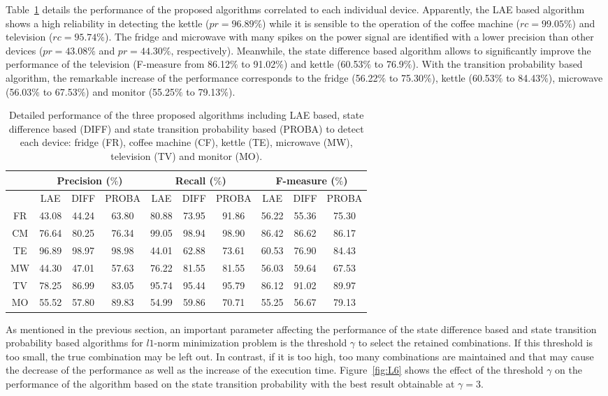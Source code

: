 Table~\ref{table:t2} details the performance of the proposed algorithms correlated to each individual device. Apparently, the LAE based algorithm shows a high reliability in detecting the kettle ($pr=96.89\%$) while it is sensible to the operation of the coffee machine ($rc=99.05\%$) and television ($rc=95.74\%$). The fridge and microwave with many spikes on the power signal are identified with a lower precision than other devices ($pr=43.08\%$ and $pr=44.30\%$, respectively). Meanwhile, the state difference based algorithm allows to significantly improve the performance of the television (F-measure from 86.12$\%$ to 91.02$\%$) and kettle (60.53$\%$ to 76.9$\%$). With the transition probability based algorithm, the remarkable increase of the performance corresponds to the fridge (56.22$\%$ to 75.30$\%$), kettle (60.53$\%$ to 84.43$\%$), microwave (56.03$\%$ to 67.53$\%$) and monitor (55.25$\%$ to 79.13$\%$).

\begin{table}
\caption{Detailed performance of the three proposed algorithms including LAE based, state difference based (DIFF) and state transition probability based (PROBA) to detect each device: fridge (FR), coffee machine (CF), kettle (TE), microwave (MW), television (TV) and monitor (MO).}\label{table:t2}
\begin{center}
\begin{tabular}{|c|c|c|c|c|c|c|c|c|c|}
\hline
&\multicolumn{3}{|c|}{Precision ($\%$)} & \multicolumn{3}{|c|}{Recall ($\%$)}&\multicolumn{3}{|c|}{F-measure ($\%$)}\\
\hline
&LAE & DIFF & PROBA & LAE & DIFF & PROBA & LAE & DIFF & PROBA\\
\hline
FR & 43.08 &44.24&63.80&80.88&73.95&91.86&56.22&55.36&75.30\\
\hline
CM&76.64&80.25&76.34&99.05&98.94&98.90&86.42&86.62&86.17\\
\hline
TE &96.89&98.97&98.98&44.01&62.88&73.61&60.53&76.90&84.43\\
\hline
MW & 44.30 & 47.01&57.63&76.22&81.55&81.55&56.03&59.64&67.53\\
\hline
TV &78.25&86.99&83.05&95.74&95.44&95.79&86.12&91.02&89.97\\
\hline
MO & 55.52&57.80&89.83 &54.99&59.86&70.71&55.25&56.67&79.13\\
\hline
\end{tabular}
\end{center}
\end{table}

As mentioned in the previous section, an important parameter affecting the performance of the state difference based and state transition probability based algorithms for $l1$-norm minimization problem is the threshold $\gamma$ to select the retained combinations. If this threshold is too small, the true combination may be left out. In contrast, if it is too high, too many combinations are maintained and that may cause the decrease of the performance as well as the increase of the execution time. Figure~\ref{fig:L6} shows the effect of the threshold $\gamma$ on the performance of the algorithm based on the state transition probability with the best result obtainable at $\gamma = 3$.

